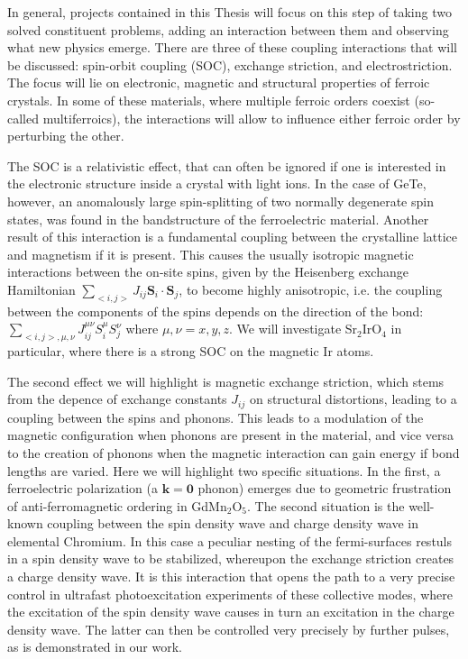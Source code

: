 In general, projects contained in this Thesis will focus on this step of taking two solved constituent problems, adding an interaction between them and observing what new physics emerge. There are three of these coupling interactions that will be discussed: spin-orbit coupling (SOC), exchange striction, and electrostriction.
The focus will lie on electronic, magnetic and structural properties of ferroic crystals. In some of these materials, where multiple ferroic orders coexist (so-called multiferroics), the interactions will allow to influence either ferroic order by perturbing the other. 

The SOC is a relativistic effect, that can often be ignored if one is interested in the electronic structure inside a crystal with light ions. In the case of GeTe, however, an anomalously large spin-splitting of two normally degenerate spin states, was found in the bandstructure of the ferroelectric material.
Another result of this interaction is a fundamental coupling between the crystalline lattice and magnetism if it is present.
This causes the usually isotropic magnetic interactions between the on-site spins, given by the Heisenberg exchange Hamiltonian $\sum_{<i,j>} J_{ij}\mathbf{S}_i \cdot \mathbf{S}_j$, to become highly anisotropic, i.e. the coupling between the components of the spins depends on the direction of the bond: $\sum_{<i,j>, \mu,\nu} J^{\mu\nu}_{ij} S^\mu_i S^\nu_j$ where $\mu,\nu = x,y,z$. We will investigate Sr$_2$IrO$_4$ in particular, where there is a strong SOC on the magnetic Ir atoms. 

The second effect we will highlight is magnetic exchange striction, which stems from the depence of exchange constants $J_{ij}$ on structural distortions, leading to a coupling between the spins and phonons. This leads to a modulation of the magnetic configuration when phonons are present in the material, and vice versa to the creation of phonons when the magnetic interaction can gain energy if bond lengths are varied. Here we will highlight two specific situations. In the first, a ferroelectric polarization (a $\bm{k} = \bm{0}$ phonon) emerges due to geometric frustration of anti-ferromagnetic ordering in GdMn$_2$O$_5$. The second situation is the well-known coupling between the spin density wave and charge density wave in elemental Chromium. In this case a peculiar nesting of the fermi-surfaces restuls in a spin density wave to be stabilized, whereupon the exchange striction creates a charge density wave.  
It is this interaction that opens the path to a very precise control in ultrafast photoexcitation experiments of these collective modes, where the excitation of the spin density wave causes in turn an excitation in the charge density wave. The latter can then be controlled very precisely by further pulses, as is demonstrated in our work.

